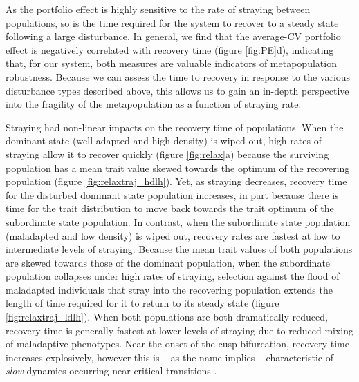 \documentclass{revtex4}
\begin{document}
As the portfolio effect is highly sensitive to the rate of straying between populations, so is the time required for the system to recover to a steady state following a large disturbance.
In general, we find that the average-CV portfolio effect is negatively correlated with recovery time (figure \ref{fig:PE}d), indicating that, for our system, both measures are valuable indicators of metapopulation robustness.
Because we can assess the time to recovery in response to the various disturbance types described above, this allows us to gain an in-depth perspective into the fragility of the metapopulation as a function of straying rate.


Straying had non-linear impacts on the recovery time of populations. 
When the dominant state (well adapted and high density) is wiped out, high rates of straying allow it to recover quickly (figure \ref{fig:relax}a) because the surviving population has a mean trait value skewed towards the optimum of the recovering population (figure \ref{fig:relaxtraj_hdlh}).
Yet, as straying decreases, recovery time for the disturbed dominant state population increases, in part because there is time for the trait distribution to move back towards the trait optimum of the subordinate state population.
In contrast, when the subordinate state population (maladapted and low density) is wiped out, recovery rates are fastest at low to intermediate levels of straying.
Because the mean trait values of both populations are skewed towards those of the dominant population, when the subordinate population collapses under high rates of straying, selection against the flood of maladapted individuals that stray into the recovering population extends the length of time required for it to return to its steady state (figure \ref{fig:relaxtraj_ldlh}).
When both populations are both dramatically reduced, recovery time is generally fastest at lower levels of straying due to reduced mixing of maladaptive phenotypes.
Near the onset of the cusp bifurcation, recovery time increases explosively, however this is -- as the name implies -- characteristic of \emph{slow} dynamics occurring near critical transitions \citep{Scheffer:2009gg,Kuehn:2010p2591}.
\end{document}
